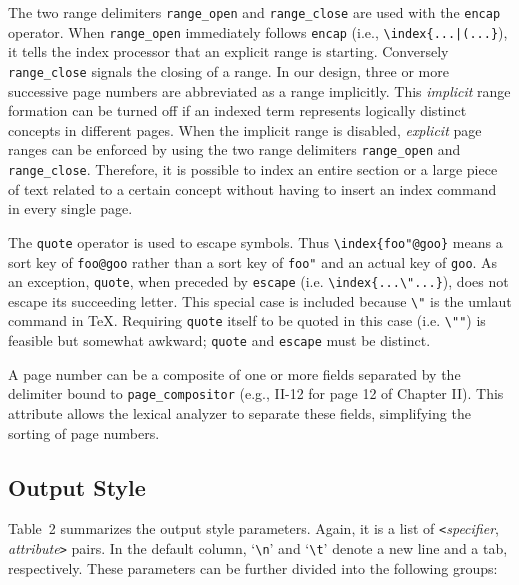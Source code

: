 The two range delimiters \verb|range_open| and \verb|range_close| are
used with the \verb|encap| operator.
When \verb|range_open| immediately follows \verb|encap|
(i.e., \verb#\index{...|(...}#),
it tells the index processor that an explicit range is starting.
Conversely \verb|range_close| signals the closing of a range.
In our design, three or more successive page numbers are abbreviated as
a range implicitly.  This {\it implicit\/} range formation can be turned
off if an indexed term represents logically distinct concepts in different
pages.  When the implicit range is disabled, {\it explicit\/} page ranges
can be enforced by using the two range delimiters
\verb|range_open| and \verb|range_close|.
Therefore, it is possible to index an entire section or a large piece
of text related to a certain concept without having to insert an index
command in every single page.

The \verb|quote| operator is used to escape symbols.
Thus \verb|\index{foo"@goo}| means a sort key of \verb|foo@goo| 
rather than a sort key of \verb|foo"| and an actual key of \verb|goo|.
As an exception, \verb|quote|, when preceded by \verb|escape| (i.e.
\verb|\index{...\"...}|), does not escape its succeeding letter.
This special case is included because \verb|\"| is the umlaut
command in {\TeX}.  Requiring \verb|quote| itself to be quoted
in this case (i.e. \verb|\""|) is feasible but somewhat awkward;
\verb|quote| and \verb|escape| must be distinct.

A page number can be a composite of one or more fields
separated by the delimiter bound to \verb|page_compositor|
(e.g., II-12 for page 12 of Chapter II).
This attribute allows the lexical analyzer to separate 
these fields, simplifying the sorting of page numbers.

\subsection{Output Style}
Table~2 summarizes the output style parameters.  Again, it is a list
of \verb|<|{\it specifier\/}, {\it attribute\/}\verb|>| pairs.
In the default column, `\verb|\n|' and `\verb|\t|' denote a new line
and a tab, respectively.  These parameters can be further divided into
the following groups:

